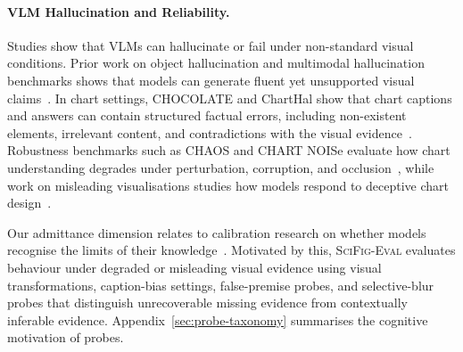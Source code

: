 
\paragraph{VLM Hallucination and Reliability.}
Studies show that VLMs can hallucinate or fail under non-standard visual conditions. Prior work on object hallucination and multimodal hallucination benchmarks shows that models can generate fluent yet unsupported visual claims~\citep{rohrbach2018object,li2023pope,guan2024hallusionbench,bai2024hallucination}. In chart settings, CHOCOLATE and ChartHal show that chart captions and answers can contain structured factual errors, including non-existent elements, irrelevant content, and contradictions with the visual evidence~\citep{huang2024chocolate,cui2025charthal}. Robustness benchmarks such as CHAOS and CHART NOISe evaluate how chart understanding degrades under perturbation, corruption, and occlusion~\citep{moured2025chaos,shin2025losing}, while work on misleading visualisations studies how models respond to deceptive chart design~\citep{tonglet2025misleading,pandey2025perils}.

Our admittance dimension relates to calibration research on whether models recognise the limits of their knowledge~\citep{kadavath2022language}. Motivated by this, \textsc{SciFig-Eval} evaluates behaviour under degraded or misleading visual evidence using visual transformations, caption-bias settings, false-premise probes, and selective-blur probes that distinguish unrecoverable missing evidence from contextually inferable evidence. Appendix~\ref{sec:probe-taxonomy} summarises the cognitive motivation of probes.


